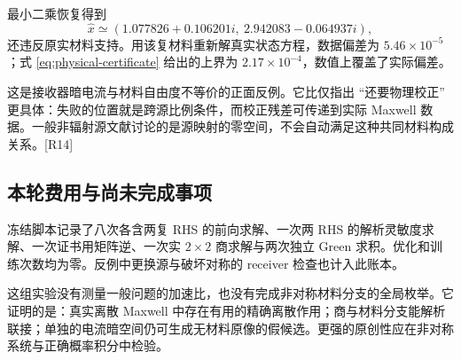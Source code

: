最小二乘恢复得到
\begin{equation}
\widehat x\simeq(1.077826+0.106201i,\ 2.942083-0.064937i),
\end{equation}
还违反原实材料支持。用该复材料重新解真实状态方程，数据偏差为 $5.46\times10^{-5}$；式 \eqref{eq:physical-certificate} 给出的上界为 $2.17\times10^{-4}$，数值上覆盖了实际偏差。

这是接收器暗电流与材料自由度不等价的正面反例。它比仅指出 ``还要物理校正'' 更具体：失败的位置就是跨源比例条件，而校正残差可传递到实际 Maxwell 数据。一般非辐射源文献讨论的是源映射的零空间，不会自动满足这种共同材料构成关系。[R14]

\subsection{本轮费用与尚未完成事项}

冻结脚本记录了八次各含两复 RHS 的前向求解、一次两 RHS 的解析灵敏度求解、一次证书用矩阵逆、一次实 $2\times2$ 商求解与两次独立 Green 求积。优化和训练次数均为零。反例中更换源与破坏对称的 receiver 检查也计入此账本。

这组实验没有测量一般问题的加速比，也没有完成非对称材料分支的全局枚举。它证明的是：真实离散 Maxwell 中存在有用的精确离散作用；商与材料分支能解析联接；单独的电流暗空间仍可生成无材料原像的假候选。更强的原创性应在非对称系统与正确概率积分中检验。
